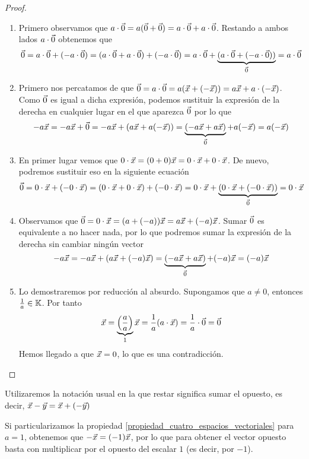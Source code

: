 \documentclass[../ecuaciones_diferenciales.tex]{subfiles}
\begin{document}
\begin{proof}
    \begin{enumerate}[wide, labelwidth=0pt, labelindent=0pt]
        \item Primero observamos que $a\cdot \vec{0} = a(\vec{0} + \vec{0}) = a \cdot \vec{0} + a \cdot \vec{0} $. Restando a ambos lados $a\cdot \vec{0}$ obtenemos que 
            \[\vec{0} = a\cdot \vec{0} + (-a\cdot \vec{0}) = (a \cdot \vec{0} + a \cdot \vec{0}) + (-a \cdot \vec{0}) =  a \cdot \vec{0} + \underbrace{(a \cdot \vec{0} + (-a \cdot \vec{0}))}_{\vec{0}} = a \cdot \vec{0} \]
        \item Primero nos percatamos de que $\vec{0} = a \cdot \vec{0} = a(\vec{x} + (-\vec{x})) = a\vec{x} +a\cdot(-\vec{x})$. Como $\vec{0}$ es igual a dicha expresión, podemos sustituir la expresión de la derecha en cualquier lugar en el que aparezca $\vec{0}$ por lo que
         \[ -a\vec{x} = -a\vec{x} + \vec{0} = -a\vec{x} + (a\vec{x} + a(-\vec{x})) = \underbrace{(-a\vec{x} + a\vec{x})}_{\vec{0}} + a(-\vec{x}) = a(-\vec{x}) \] 
        \item En primer lugar vemos que $0 \cdot \vec{x} = (0+0)\vec{x} = 0 \cdot \vec{x} + 0 \cdot \vec{x}$. De nuevo, podremos sustituir eso en la siguiente ecuación
        \[\vec{0}  = 0 \cdot \vec{x} +(-0\cdot \vec{x}) = (0\cdot \vec{x} + 0\cdot \vec{x}) + (-0\cdot \vec{x}) =  0\cdot \vec{x} + \underbrace{(0\cdot \vec{x} + (-0\cdot \vec{x}))}_{\vec{0}} = 0\cdot\vec{x}\]
        \item Observamos que $\vec{0} = 0 \cdot \vec{x} = (a + (-a))\vec{x} = a\vec{x} + (-a)\vec{x}$. Sumar $\vec{0}$ es equivalente a no hacer nada, por lo que podremos sumar la expresión de la derecha sin cambiar ningún vector
        \[-a\vec{x} = -a\vec{x} + (a\vec{x} + (-a)\vec{x}) = \underbrace{(-a\vec{x} + a\vec{x})}_{\vec{0}} + (-a)\vec{x} = (-a)\vec{x} \]
        \item Lo demostraremos por reducción al absurdo. Supongamos que $a \neq 0$, entonces $\frac{1}{a} \in \mathbb{K}$. Por tanto
        \[\vec{x} = \underbrace{\left(\frac{a}{a} \right)}_{1} \vec{x} = \frac{1}{a} (a \cdot \vec{x}) = \frac{1}{a} \cdot \vec{0} = \vec{0}\]
        Hemos llegado a que $\vec{x} = 0$, lo que es una contradicción.
    \end{enumerate}
\end{proof}

\begin{notation}
    Utilizaremos la notación usual en la que restar significa sumar el opuesto, es decir, $\vec{x} - \vec{y} = \vec{x} + (-\vec{y})$
\end{notation}

\begin{remark}
    Si particularizamos la propiedad \ref{propiedad_cuatro_espacios_vectoriales} para $a=1$, obtenemos que $-\vec{x} = (-1)\vec{x}$, por lo que para obtener el vector opuesto basta con multiplicar por el opuesto del escalar $1$ (es decir, por $-1$).
\end{remark}
\end{document}

